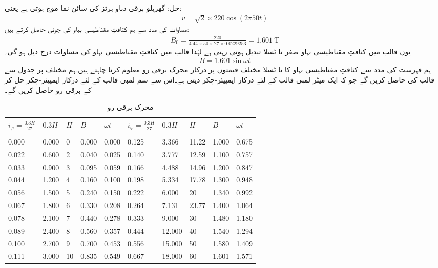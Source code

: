 حل:
	گھریلو برقی دباو  ہرٹز کی سائن نما موج ہوتی ہے یعنی:
\begin{align}
v=\sqrt{2} \times 220 \cos (2 \pi  50 t)
\end{align}
مساوات   کی مدد سے ہم کثافتِ مقناطیسی بہاو کی چوٹی حاصل کرتے ہیں:
\begin{align}
B_0=\frac{220}{4.44 \times 50 \times 27 \times 0.0229253}=\SI{1.601}{\tesla}
\end{align}
یوں قالب میں کثافتِ مقناطیسی بہاو صفر تا   ٹسلا  تبدیل ہوتی رہتی ہے لہٰذا  قالب میں کثافتِ مقناطیسی بہاو کی مساوات درج ذیل ہو گی۔
\begin{align}\label{مساوات_مقناطیسی_دور_سائن_نما_کثافت_بہاو}
B=1.601 \sin \omega t
\end{align}
ہم فہرست کی مدد سے کثافتِ مقناطیسی بہاو کا   تا  ٹسلا  مختلف قیمتوں پر درکار محرک برقی رو  معلوم کرنا چاہتے ہیں۔ہم مختلف  پر جدول  سے قالب کی  حاصل کریں گے جو کہ ایک میٹر لمبی قالب کے لئے درکار ایمپیئر-چکر دیتی ہے۔اس سے  سم لمبی قالب کے لئے درکار ایمپیئر-چکر  حل کر کے برقی رو حاصل کریں گے۔

%
\begin{table}
\begin{tabular}{l l l l l | l l l l l}
$i_{\varphi}=\frac{0.3 H}{27}$&$0.3H$&$H$&$B$&$\omega t$&$i_{\varphi}=\frac{0.3 H}{27}$&$0.3H$&$H$&$B$&$\omega t$\\
\hline\\
0.000&0.000&0&0.000&0.000&0.125&3.366&11.22&1.000&0.675\\
0.022&0.600&2&0.040&0.025&0.140&3.777&12.59&1.100&0.757\\
0.033&0.900&3&0.095&0.059&0.166&4.488&14.96&1.200&0.847\\
0.044&1.200&4&0.160&0.100&0.198&5.334&17.78&1.300&0.948\\
0.056&1.500&5&0.240&0.150&0.222&6.000&20&1.340&0.992\\
0.067&1.800&6&0.330&0.208&0.264&7.131&23.77&1.400&1.064\\
0.078&2.100&7&0.440&0.278&0.333&9.000&30&1.480&1.180\\
0.089&2.400&8&0.560&0.357&0.444&12.000&40&1.540&1.294\\
0.100&2.700&9&0.700&0.453&0.556&15.000&50&1.580&1.409\\
0.111&3.000&10&0.835&0.549&0.667&18.000&60&1.601&1.571\\
\hline
\end{tabular}
\caption{محرک برقی رو}
\label{جدول_مقناطیسی_ادوار_محرک_برقی_رو_بالمقابل_کثافت_بہاو}
\end{table}

